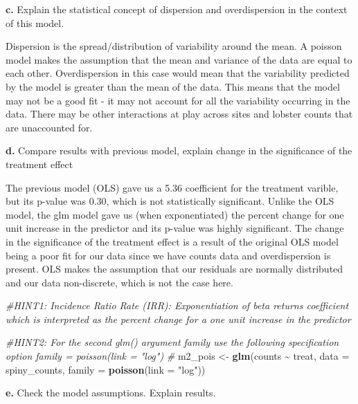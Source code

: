 \documentclass[
]{article}
\newenvironment{Shaded}{\begin{snugshade}}{\end{snugshade}}
\newcommand{\AttributeTok}[1]{\textcolor[rgb]{0.13,0.29,0.53}{#1}}
\newcommand{\CommentTok}[1]{\textcolor[rgb]{0.56,0.35,0.01}{\textit{#1}}}
\newcommand{\FunctionTok}[1]{\textcolor[rgb]{0.13,0.29,0.53}{\textbf{#1}}}
\newcommand{\NormalTok}[1]{#1}
\newcommand{\OtherTok}[1]{\textcolor[rgb]{0.56,0.35,0.01}{#1}}
\newcommand{\SpecialCharTok}[1]{\textcolor[rgb]{0.81,0.36,0.00}{\textbf{#1}}}
\newcommand{\StringTok}[1]{\textcolor[rgb]{0.31,0.60,0.02}{#1}}
\begin{document}
\textbf{c.} Explain the statistical concept of dispersion and
overdispersion in the context of this model.

Dispersion is the spread/distribution of variability around the mean. A
poisson model makes the assumption that the mean and variance of the
data are equal to each other. Overdispersion in this case would mean
that the variability predicted by the model is greater than the mean of
the data. This means that the model may not be a good fit - it may not
account for all the variability occurring in the data. There may be
other interactions at play across sites and lobster counts that are
unaccounted for.

\textbf{d.} Compare results with previous model, explain change in the
significance of the treatment effect

The previous model (OLS) gave us a 5.36 coefficient for the treatment
varible, but its p-value was 0.30, which is not statistically
significant. Unlike the OLS model, the glm model gave us (when
exponentiated) the percent change for one unit increase in the predictor
and its p-value was highly significant. The change in the significance
of the treatment effect is a result of the original OLS model being a
poor fit for our data since we have counts data and overdispersion is
present. OLS makes the assumption that our residuals are normally
distributed and our data non-discrete, which is not the case here.

\begin{Shaded}
\begin{Highlighting}[]
\CommentTok{\#HINT1: Incidence Ratio Rate (IRR): Exponentiation of beta returns coefficient which is interpreted as the \textquotesingle{}percent change\textquotesingle{} for a one unit increase in the predictor }

\CommentTok{\#HINT2: For the second glm() argument \textasciigrave{}family\textasciigrave{} use the following specification option \textasciigrave{}family = poisson(link = "log")\textasciigrave{}}
\CommentTok{\#}
\NormalTok{m2\_pois }\OtherTok{\textless{}{-}} \FunctionTok{glm}\NormalTok{(counts }\SpecialCharTok{\textasciitilde{}}\NormalTok{ treat, }
                   \AttributeTok{data =}\NormalTok{ spiny\_counts,}
                   \AttributeTok{family =} \FunctionTok{poisson}\NormalTok{(}\AttributeTok{link =} \StringTok{"log"}\NormalTok{)) }
\end{Highlighting}
\end{Shaded}

\textbf{e.} Check the model assumptions. Explain results.
\end{document}
